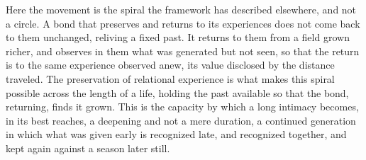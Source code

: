 Here the movement is the spiral the framework has described elsewhere, and not a circle. A bond that preserves and returns to its experiences does not come back to them unchanged, reliving a fixed past. It returns to them from a field grown richer, and observes in them what was generated but not seen, so that the return is to the same experience observed anew, its value disclosed by the distance traveled. The preservation of relational experience is what makes this spiral possible across the length of a life, holding the past available so that the bond, returning, finds it grown. This is the capacity by which a long intimacy becomes, in its best reaches, a deepening and not a mere duration, a continued generation in which what was given early is recognized late, and recognized together, and kept again against a season later still.
